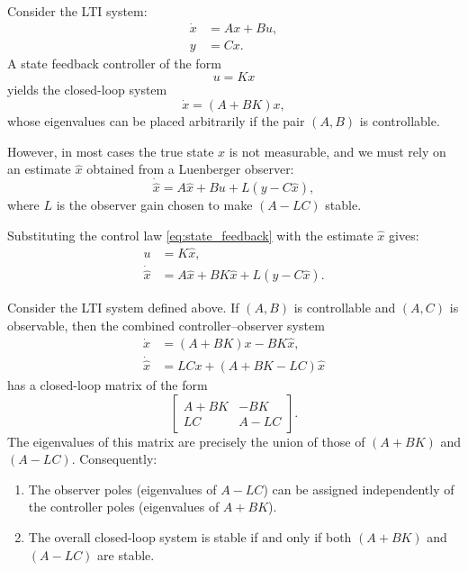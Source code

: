 \noindent Consider the LTI system:
\begin{align}
    \dot{x} &= A x + B u, \\
    y &= C x.
\end{align}
A state feedback controller of the form
\begin{equation}\label{eq:state_feedback}
    u = Kx
\end{equation}
yields the closed-loop system
\begin{equation}
    \dot{x} = (A + BK)x,
\end{equation}
whose eigenvalues can be placed arbitrarily if the pair $(A,B)$ is controllable.

\noindent However, in most cases the true state $x$ is not measurable, and we must rely on an estimate 
$\hat{x}$ obtained from a Luenberger observer:
\begin{equation}\label{eq:observer_equation}
    \dot{\hat{x}} = A\hat{x} + Bu + L(y - C\hat{x}),
\end{equation}
where $L$ is the observer gain chosen to make $(A - LC)$ stable.

\noindent Substituting the control law \eqref{eq:state_feedback} with the estimate $\hat{x}$ gives:
\begin{align}
    u &= K\hat{x}, \label{eq:output_feedback} \\
    \dot{\hat{x}} &= A\hat{x} + B K \hat{x} + L(y - C\hat{x}). \label{eq:observer_with_feedback}
\end{align}

\begin{theorem}
Consider the LTI system defined above.  
If $(A,B)$ is controllable and $(A,C)$ is observable, 
then the combined controller--observer system
\begin{align}
    \dot{x} &= (A + BK)x - BK\hat{x}, \\
    \dot{\hat{x}} &= L C x + (A + BK - L C)\hat{x}
\end{align}
has a closed-loop matrix of the form
\begin{equation}
    \begin{bmatrix}
        A + BK & -BK \\
        L C     & A - L C
    \end{bmatrix}.
\end{equation}
The eigenvalues of this matrix are precisely the union of those of $(A + BK)$ 
and $(A - L C)$. Consequently:
\begin{enumerate}
    \item The observer poles (eigenvalues of $A - LC$) 
          can be assigned independently of the controller poles 
          (eigenvalues of $A + BK$).
    \item The overall closed-loop system is stable 
          if and only if both $(A + BK)$ and $(A - LC)$ are stable.
\end{enumerate}
\end{theorem}

